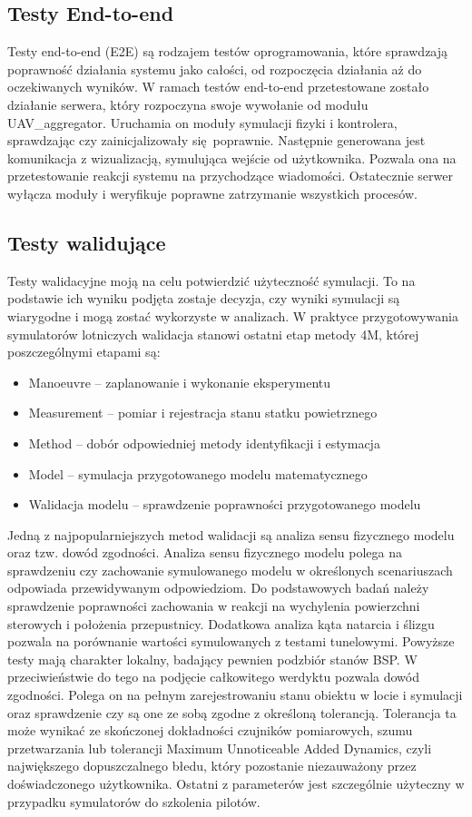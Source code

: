 \documentclass[15pt]{sprawozdanie}
\begin{document}
\subsection{Testy End-to-end}

Testy end-to-end (E2E) są rodzajem testów oprogramowania, które sprawdzają poprawność działania systemu jako całości, od rozpoczęcia działania aż do oczekiwanych wyników. W ramach testów end-to-end przetestowane zostało działanie serwera, który rozpoczyna swoje wywołanie od modułu UAV\_aggregator. Uruchamia on moduły symulacji fizyki i kontrolera, sprawdzając czy zainicjalizowały się poprawnie. 
Następnie generowana jest komunikacja z wizualizacją, symulująca wejście od użytkownika. Pozwala ona na przetestowanie reakcji systemu na przychodzące wiadomości.
Ostatecznie serwer wyłącza moduły i weryfikuje poprawne zatrzymanie wszystkich procesów. 

\subsection{Testy walidujące}

Testy walidacyjne moją na celu potwierdzić użyteczność symulacji. To na podstawie ich wyniku podjęta zostaje decyzja, czy wyniki symulacji są wiarygodne i mogą zostać wykorzyste w analizach. W praktyce przygotowywania symulatorów lotniczych walidacja stanowi ostatni etap metody 4M, której poszczególnymi etapami są:
\begin{itemize}[noitemsep]
\item Manoeuvre -- zaplanowanie i wykonanie eksperymentu
\item Measurement -- pomiar i rejestracja stanu statku powietrznego
\item Method -- dobór odpowiedniej metody identyfikacji i estymacja
\item Model -- symulacja przygotowanego modelu matematycznego
\item Walidacja modelu -- sprawdzenie poprawności przygotowanego modelu
\end{itemize}

Jedną z najpopularniejszych metod walidacji są analiza sensu fizycznego modelu oraz tzw. dowód zgodności. Analiza sensu fizycznego modelu polega na sprawdzeniu czy zachowanie symulowanego modelu w określonych scenariuszach odpowiada przewidywanym odpowiedziom. Do podstawowych badań należy sprawdzenie poprawności zachowania w reakcji na wychylenia powierzchni sterowych i położenia przepustnicy. Dodatkowa analiza kąta natarcia i ślizgu pozwala na porównanie wartości symulowanych z testami tunelowymi. Powyższe testy mają charakter lokalny, badający pewnien podzbiór stanów BSP. W przeciwieństwie do tego na podjęcie całkowitego werdyktu pozwala dowód zgodności. Polega on na pełnym zarejestrowaniu stanu obiektu w locie i symulacji oraz sprawdzenie czy są one ze sobą zgodne z określoną tolerancją. Tolerancja ta może wynikać ze skończonej dokładności czujników pomiarowych, szumu przetwarzania lub tolerancji Maximum Unnoticeable Added Dynamics, czyli największego dopuszczalnego błedu, który pozostanie niezauważony przez doświadczonego użytkownika. Ostatni z parameterów jest szczególnie użyteczny w przypadku symulatorów do szkolenia pilotów.\\
\end{document}
